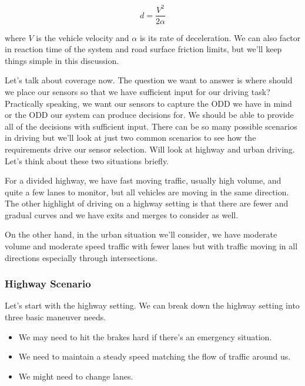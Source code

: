 \begin{equation}
d = \frac{V^2}{2\alpha}
\label{stopping_distance}
\end{equation}

where $V$ is the vehicle velocity and  $\alpha$ is its rate of deceleration. 
We can also factor in reaction time of the system and road surface friction limits, but we'll keep things simple in this discussion. 

Let's talk about coverage now. The question we want to answer is where should we place our sensors so that we have sufficient input for our driving task? 
Practically speaking, we want our sensors to capture the ODD we have in mind or the ODD our system can produce decisions for. 
We should be able to provide all of the decisions with sufficient input. 
There can be so many possible scenarios in driving but we'll look at just two common scenarios to see how the requirements drive our sensor selection. 
Will look at highway and urban driving. Let's think about these two situations briefly. 


For a divided highway, we have fast moving traffic, usually high volume, and quite a few lanes to monitor, 
but all vehicles are moving in the same direction. The other highlight of driving on a highway setting is that there are 
fewer and gradual curves and we have exits and merges to consider as well. 

On the other hand, in the urban situation we'll consider, 
we have moderate volume and moderate speed traffic with fewer lanes but with 
traffic moving in all directions especially through intersections. 

\subsubsection{Highway Scenario}

Let's start with the highway setting. 
We can break down the highway setting into three basic maneuver needs. 

\begin{itemize}
\item We may need to hit the brakes hard if there's an emergency situation. 
\item We need to maintain a steady speed matching the flow of traffic around us.
\item We might need to change lanes. 
\end{itemize}

